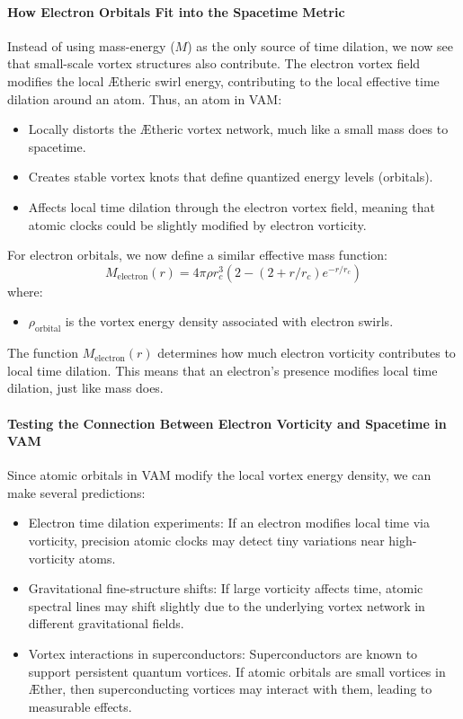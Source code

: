 \paragraph{How Electron Orbitals Fit into the Spacetime Metric}
Instead of using mass-energy ($M$) as the only source of time dilation, we now see that small-scale vortex structures also contribute.
The electron vortex field modifies the local Ætheric swirl energy, contributing to the local effective time dilation around an atom.
Thus, an atom in VAM:
\begin{itemize}
    \item Locally distorts the Ætheric vortex network, much like a small mass does to spacetime.
    \item Creates stable vortex knots that define quantized energy levels (orbitals).
    \item Affects local time dilation through the electron vortex field, meaning that atomic clocks could be slightly modified by electron vorticity.
\end{itemize}
For electron orbitals, we now define a similar effective mass function:
\begin{equation*}
    M_{\text{electron}}(r)=4 \pi \rho r_c^3  \left( 2 - (2 + r/r_c) e^{-r / r_c} \right)
\end{equation*}
where:
\begin{itemize}
    \item $\rho_{\text{orbital}}$ is the vortex energy density associated with electron swirls.
\end{itemize}
The function $M_{\text{electron}}(r)$ determines how much electron vorticity contributes to local time dilation.
This means that an electron’s presence modifies local time dilation, just like mass does.

\paragraph{Testing the Connection Between Electron Vorticity and Spacetime in VAM}
Since atomic orbitals in VAM modify the local vortex energy density, we can make several predictions:
\begin{itemize}
    \item Electron time dilation experiments: If an electron modifies local time via vorticity, precision atomic clocks may detect tiny variations near high-vorticity atoms.
    \item Gravitational fine-structure shifts: If large vorticity affects time, atomic spectral lines may shift slightly due to the underlying vortex network in different gravitational fields.
    \item Vortex interactions in superconductors: Superconductors are known to support persistent quantum vortices. If atomic orbitals are small vortices in Æther, then superconducting vortices may interact with them, leading to measurable effects.
\end{itemize}

